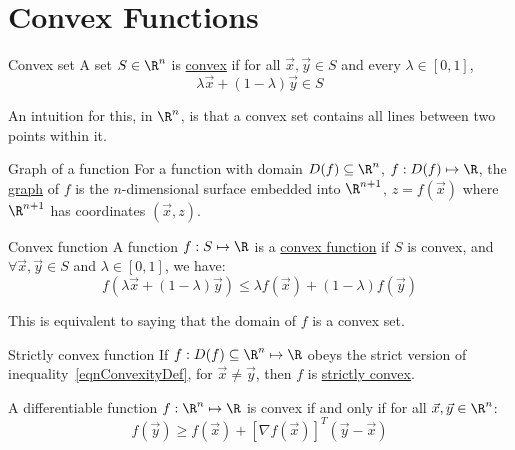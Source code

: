 \documentclass[../Main.tex]{subfiles}
\begin{document}
\section{Convex Functions}
\begin{definition}{Convex set}
    A set $S \in \R^n$ is \underline{convex} if for all $\vec{x}, \vec{y} \in S$ and every $\lambda \in [0, 1]$,
    \begin{equation*}
        \lambda \vec{x} + (1 - \lambda) \vec{y} \in S
    \end{equation*}
\end{definition}
\begin{remark}
    An intuition for this, in $\R^n$, is that a convex set contains all lines between two points within it.
\end{remark}
\begin{definition}{Graph of a function}
    For a function with domain $D(f) \subseteq \R^n$, $f : D(f) \mapsto \R$, the \underline{graph} of $f$ is the $n$-dimensional surface embedded into $\R^{n+1}$, $z = f(\vec{x})$ where $\R^{n+1}$ has coordinates $(\vec{x}, z)$.
\end{definition}
\begin{definition}{Convex function}
    A function $f : S \mapsto \R$ is a \underline{convex function} if $S$ is convex, and $\forall \vec{x}, \vec{y} \in S$ and $\lambda \in [0, 1]$, we have:
    \begin{equation}
        f(\lambda \vec{x} + (1-\lambda)\vec{y}) \leq \lambda f(\vec{x}) + (1 - \lambda) f(\vec{y})
        \label{eqnConvexityDef}
    \end{equation}
\end{definition}
\begin{remark}
    This is equivalent to saying that the domain of $f$ is a convex set.
\end{remark}
\begin{definition}{Strictly convex function}
    If $f : D(f) \subseteq \R^n \mapsto \R$ obeys the strict version of inequality~\ref{eqnConvexityDef}, for $\vec{x} \neq \vec{y}$, then $f$ is \underline{strictly convex}.
\end{definition}
\begin{theorem}
    A differentiable function $f : \R^n \mapsto \R$ is convex if and only if for all $\vec{x}, \vec{y} \in \R^n$:
    \begin{equation}
        f(\vec{y}) \geq f(\vec{x}) + \left[\nabla f(\vec{x})\right]^T(\vec{y} - \vec{x})
        \label{eqnFirstOrderCondition}
    \end{equation}
    \label{thmFirstOrderCondition}
\end{theorem}
\end{document}
